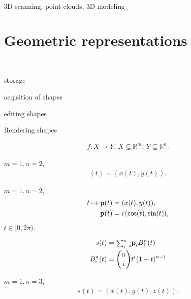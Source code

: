 \begin{compactdesc}
	\item[\lp{Acquired real-world objects}] 3D scanning, point clouds, 3D modeling
	\item[\lp{procedural modeling}]\mbox\\
\section{Geometric representations}
	\item[\lp{Considerations}]\hfill\\
		\begin{enumerate*}[label=\protect\circled{\arabic*},itemjoin=]
			\item storage\\
			\item acqisition of shapes\\
			\item editing shapes\\
			\item Rendering shapes
		\end{enumerate*}
	\item[\lp{Parametric curves \& surfaces}]
		\begin{gather*}
			f: X\to Y,\, X\subseteq \mathbb{R}^m,\, Y\subseteq \mathbb{R}^n.
		\end{gather*}
	\item[\lp{planar curve}] $m=1,n=2$,
		\begin{gather*}
			(t)=(x(t),y(t)).
		\end{gather*}
	\item[\lp{circle}] $m=1,n=2$,
		\begin{align*}
			t\mapsto \bm{\mathrm{p}}(t)&=(x(t),y(t)),\\
			\bm{\mathrm{p}}(t)&=r(\cos(t),\sin(t)),
		\end{align*}
	 $t\in[0,2\pi)$.
	\item[\lp{Bezier curves}]\mbox\\
		\begin{align*}
			s(t)&={\scriptstyle\sum_{i=0}^{n}}\bm{\mathrm{p}}_iB_{i}^{n}(t)\\
			B_{i}^{n}(t)&={n\choose i}t^i(1-t)^{n-i}
		\end{align*}
	\item[\lp{Space curves in 3D}] $m=1,n=3$,
		\begin{gather*}
			s(t)=(x(t),y(t),z(t)).
		\end{gather*}

\end{compactdesc}
